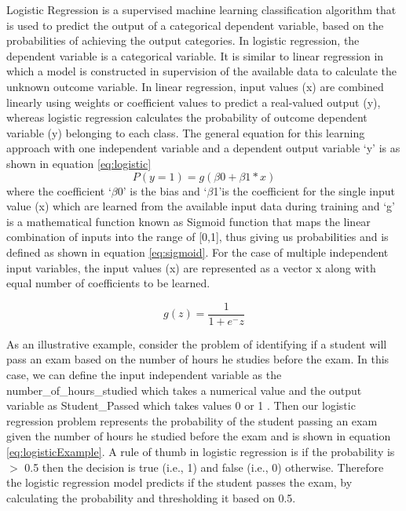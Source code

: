 \documentclass[11pt,openright]{report}
\begin{document}
Logistic Regression is a supervised machine learning classification algorithm that is used to predict the output of a categorical dependent variable, based on the probabilities of achieving the output categories. In logistic regression, the dependent variable is a categorical variable. It is similar to linear regression in which a model is constructed in supervision of the available data to calculate the unknown outcome variable. In linear regression, input values (x) are combined linearly using weights or coefficient values to predict a real-valued output (y), whereas logistic regression calculates the probability of outcome dependent variable (y) belonging to each class. The general equation for this learning approach with one independent variable and a dependent output variable `y' is as shown in equation \ref{eq:logistic} 
\begin{equation}
 P(y=1)= g(\beta0+\beta1 *x )  \label{eq:logistic} 
 \end{equation}
 where the coefficient `$\beta$0' is the bias and \lq$\beta$1\rq  is the coefficient for the single input value (x) which are learned from the available input data during training and `g' is a mathematical function known as Sigmoid function that maps the linear combination of inputs into the range of [0,1], thus giving us probabilities and is defined as shown in equation \ref{eq:sigmoid}. For the case of multiple independent input variables, the input values (x) are represented as a vector x along with equal number of coefficients to be learned.
 
\begin{equation}
 g(z) =  \frac{\mathrm{1} }{\mathrm{1} + e^- z }  \label{eq:sigmoid} 
 \end{equation}

As an illustrative example, consider the problem of identifying if a student will pass an exam based on the number of hours he studies before the exam. In this case, we can define the input independent variable as the number\_of\_hours\_studied which takes a numerical value and the output variable as Student\_Passed which takes values { 0 or 1 }. Then our logistic regression problem represents the probability of the student passing an exam given the number of hours he studied before the exam and is shown in equation \ref{eq:logisticExample}. A rule of thumb in logistic regression is if the probability is $>$ 0.5 then the decision is true (i.e., 1) and false (i.e., 0) otherwise. Therefore the logistic regression model predicts if the student passes the exam, by calculating the probability and thresholding it based on 0.5.
\end{document}
